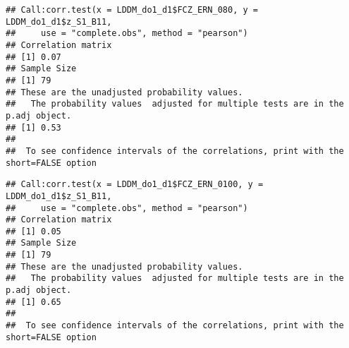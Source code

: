 \documentclass[
]{article}
\newenvironment{Shaded}{\begin{snugshade}}{\end{snugshade}}
\newcommand{\AttributeTok}[1]{\textcolor[rgb]{0.77,0.63,0.00}{#1}}
\newcommand{\FunctionTok}[1]{\textcolor[rgb]{0.00,0.00,0.00}{#1}}
\newcommand{\NormalTok}[1]{#1}
\newcommand{\SpecialCharTok}[1]{\textcolor[rgb]{0.00,0.00,0.00}{#1}}
\newcommand{\StringTok}[1]{\textcolor[rgb]{0.31,0.60,0.02}{#1}}
\begin{document}
\begin{Shaded}
\end{Shaded}

\begin{verbatim}
## Call:corr.test(x = LDDM_do1_d1$FCZ_ERN_080, y = LDDM_do1_d1$z_S1_B11, 
##     use = "complete.obs", method = "pearson")
## Correlation matrix 
## [1] 0.07
## Sample Size 
## [1] 79
## These are the unadjusted probability values.
##   The probability values  adjusted for multiple tests are in the p.adj object. 
## [1] 0.53
## 
##  To see confidence intervals of the correlations, print with the short=FALSE option
\end{verbatim}

\begin{Shaded}
\end{Shaded}

\begin{verbatim}
## Call:corr.test(x = LDDM_do1_d1$FCZ_ERN_0100, y = LDDM_do1_d1$z_S1_B11, 
##     use = "complete.obs", method = "pearson")
## Correlation matrix 
## [1] 0.05
## Sample Size 
## [1] 79
## These are the unadjusted probability values.
##   The probability values  adjusted for multiple tests are in the p.adj object. 
## [1] 0.65
## 
##  To see confidence intervals of the correlations, print with the short=FALSE option
\end{verbatim}

\begin{Shaded}
\end{Shaded}
\end{document}
